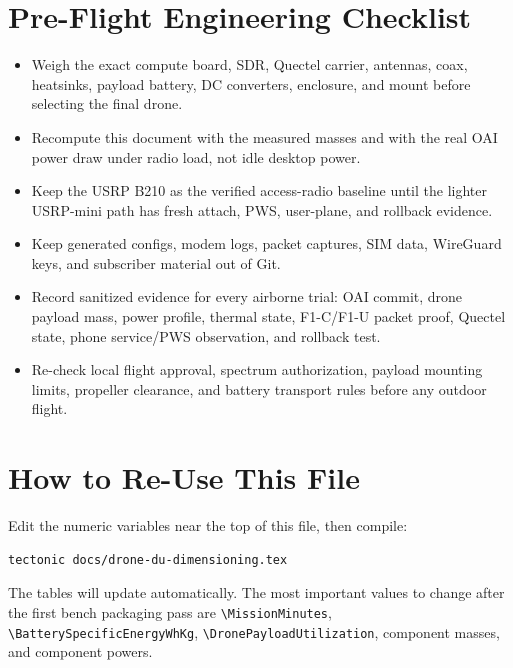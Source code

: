 \documentclass[11pt]{article}
\begin{document}
\section*{Pre-Flight Engineering Checklist}

\begin{itemize}
  \item Weigh the exact compute board, SDR, Quectel carrier, antennas, coax,
        heatsinks, payload battery, DC converters, enclosure, and mount before
        selecting the final drone.
  \item Recompute this document with the measured masses and with the real OAI
        power draw under radio load, not idle desktop power.
  \item Keep the USRP B210 as the verified access-radio baseline until the
        lighter USRP-mini path has fresh attach, PWS, user-plane, and rollback
        evidence.
  \item Keep generated configs, modem logs, packet captures, SIM data, WireGuard
        keys, and subscriber material out of Git.
  \item Record sanitized evidence for every airborne trial: OAI commit, drone
        payload mass, power profile, thermal state, F1-C/F1-U packet proof,
        Quectel state, phone service/PWS observation, and rollback test.
  \item Re-check local flight approval, spectrum authorization, payload mounting
        limits, propeller clearance, and battery transport rules before any
        outdoor flight.
\end{itemize}

\section*{How to Re-Use This File}

Edit the numeric variables near the top of this file, then compile:

\begin{verbatim}
tectonic docs/drone-du-dimensioning.tex
\end{verbatim}

The tables will update automatically. The most important values to change after
the first bench packaging pass are \texttt{\textbackslash MissionMinutes},
\texttt{\textbackslash BatterySpecificEnergyWhKg},
\texttt{\textbackslash DronePayloadUtilization}, component masses, and component
powers.
\end{document}
